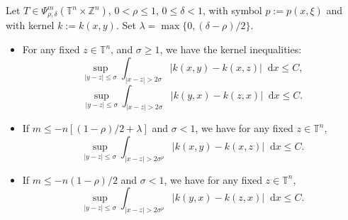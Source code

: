 \documentclass[10pt,a4paper]{amsart}
\newcommand*\diff{\mathop{}\!\mathrm{d}}
\begin{document}
\begin{theorem}
    Let $T \in \Psi^m_{\rho, \delta}(\mathbb{T}^n \times \mathbb{Z}^n) $, $0 < \rho \leq 1$, $0 \leq \delta < 1$, with symbol $p:=p(x, \xi)$ and with kernel $k:=k(x, y)$. Set $\lambda = \max\{ 0, (\delta - \rho)/2 \}$.
    \begin{itemize}
        \item[(a)] For any fixed $z \in \mathbb{T}^n$, and $\sigma \geq 1$, we have the kernel inequalities:
        \begin{equation}
            \sup_{|y-z| \leq \sigma} \int_{|x-z| > 2\sigma}|k(x, y) - k(x, z)|\diff x \leq C,
        \end{equation}
        \begin{equation}
            \sup_{|y-z| \leq \sigma} \int_{|x-z| > 2\sigma}|k(y, x) - k(z, x)|\diff x \leq C.
        \end{equation}
        \item[(b)] If $m \leq -n [(1-\rho)/2 + \lambda] $ and $\sigma < 1$, we have for any fixed $z \in \mathbb{T}^n$, 
        \begin{equation}
            \sup_{|y-z| \leq \sigma} \int_{|x-z| > 2\sigma^\rho}|k(x, y) - k(x, z)|\diff x \leq C.
        \end{equation}
        \item[(c)] If $m \leq -n (1 - \rho) / 2$ and $\sigma < 1$, we have  for any fixed $z \in \mathbb{T}^n$,
        \begin{equation}
            \sup_{|y-z| \leq \sigma} \int_{|x-z| > 2\sigma^\rho}|k(y, x) - k(z, x)|\diff x \leq C.
        \end{equation} 
    \end{itemize}
    \label{theo:sigma-kernel-estimate}
\end{theorem}
\end{document}
